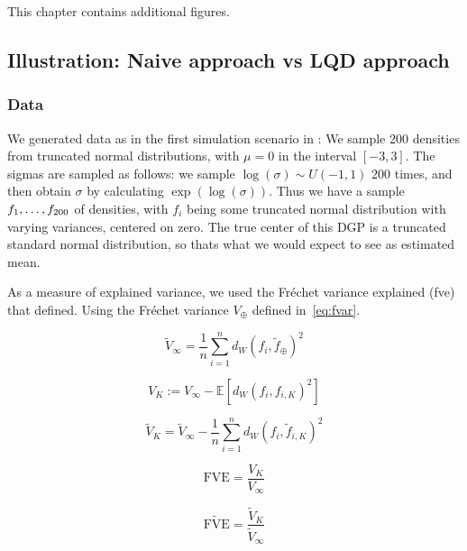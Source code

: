 This chapter contains additional figures.

\subsection{Illustration: Naive approach vs LQD approach}
\label{sec:illustration_lqd}

\subsubsection{Data}
\label{sec:dgp_descriptives}
We generated data as in the first simulation scenario in \textcite{PetersenMüller2016}:
We sample 200 densities from truncated normal distributions, with $\mu = 0$ in the
interval $[-3,3]$. The sigmas are sampled as follows: we sample $\log(\sigma) \sim U(-1,1)$
200 times, and then obtain $\sigma$ by calculating $\exp(\log(\sigma))$. Thus we have a sample
$f_1, \nobreak \dots, \nobreak f_{200}$ of densities, with $f_i$ being some truncated
normal distribution with varying variances, centered on zero. The true center of this DGP
is a truncated standard normal distribution, so thats what we would expect to see as
estimated mean.

As a measure of explained variance, we used the Fréchet variance explained (fve) that
\textcite{PetersenMüller2016} defined. Using the Fréchet variance $V_\oplus$ defined
in~\ref{eq:fvar}.

\begin{equation}
    \tilde{V}_\infty = \frac{1}{n} \sum_{i=1}^{n} d_W(f_i, \tilde{f}_\oplus)^2
    \label{eq:tilde_V_infinity}
\end{equation}

\begin{equation}
    V_K := V_\infty - \mathbb{E}\left[d_W(f_i, f_{i,K})^2\right]
    \label{eq:V_K}
\end{equation}

\begin{equation}
    \tilde{V}_K = \tilde{V}_\infty - \frac{1}{n} \sum_{i=1}^{n} d_W(f_i, \tilde{f}_{i,K})^2
    \label{eq:tilde_V_K}
\end{equation}

\begin{equation}
    \text{FVE} = \frac{V_K}{V_\infty}
    \label{eq:FVE}
\end{equation}

\begin{equation}
    \tilde{\text{FVE}} = \frac{\tilde{V}_K}{\tilde{V}_\infty}
    \label{eq:tilde_FVE}
\end{equation}

